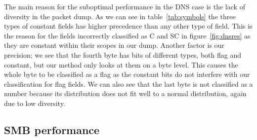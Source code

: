 \documentclass[a4paper]{report}
\begin{document}
The main reason for the suboptimal performance in the DNS case is the lack of
diversity in the packet dump. As we can see in table~\ref{tab:symbols} the
three types of constant fields has higher precedence than any other type of
field. This is the reason for the fields incorrectly classified as C and SC in
figure~\ref{fig:dnsres} as they are constant within their scopes in our dump.
Another factor is our precision; we see that the fourth byte has bits of
different types, both flag and constant, but our method only looks at them on
a byte level. This causes the whole byte to be classified as a flag as the
constant bits do not interfere with our classification for flag fields. We can
also see that the last byte is not classified as a number because its
distribution does not fit well to a normal distribution, again due to low
diversity.

\subsection{SMB performance}

\end{document}
